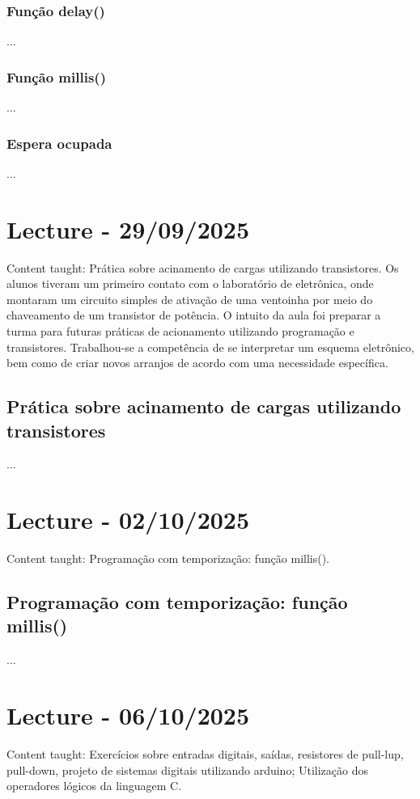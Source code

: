 \documentclass{article}
\begin{document}
\subsubsection{Função delay()}
...

\subsubsection{Função millis()}
...

\subsubsection{Espera ocupada}
...


\section{Lecture - 29/09/2025}
Content taught: Prática sobre acinamento de cargas utilizando transistores. Os alunos tiveram um primeiro contato com o laboratório de eletrônica, onde montaram um circuito simples de ativação de uma ventoinha por meio do chaveamento de um transistor de potência. O intuito da aula foi preparar a turma para futuras práticas de acionamento utilizando programação e transistores. Trabalhou-se a competência de se interpretar um esquema eletrônico, bem como de criar novos arranjos de acordo com uma necessidade específica.

\subsection{Prática sobre acinamento de cargas utilizando transistores}
...

\section{Lecture - 02/10/2025}
Content taught: Programação com temporização: função millis().

\subsection{Programação com temporização: função millis()}
...

\section{Lecture - 06/10/2025}
Content taught: Exercícios sobre entradas digitais, saídas, resistores de pull-lup, pull-down, projeto de sistemas digitais utilizando arduino; Utilização dos operadores lógicos da linguagem C.
\end{document}
